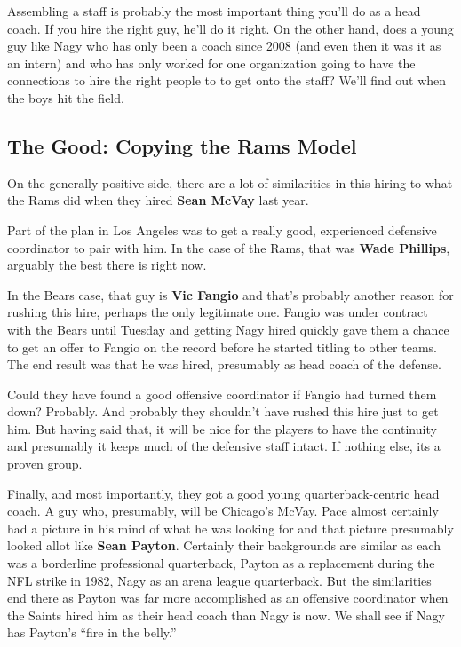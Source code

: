 \documentclass[11pt]{article}
\begin{document}
Assembling a staff is probably the most important thing you'll do as a
head coach.  If you hire the right guy, he'll do it right.  On the
other hand, does a young guy like Nagy who has only been a coach since
2008 (and even then it was it as an intern) and who has only
worked for one organization going to have the connections to hire the
right people to to get onto the staff?  We'll find out when the boys
hit the field.

\subsection{The Good:  Copying the Rams Model}

On the generally positive side, there are a lot of similarities in this hiring
to what the Rams did when they hired \textbf{Sean McVay} last year.

Part of the plan in Los Angeles was to get a really good, experienced
defensive coordinator to pair with him.  In the case of the Rams, that was \textbf{Wade
  Phillips}, arguably the best there is right now.

In the Bears case, that guy is \textbf{Vic Fangio} and that's probably
another reason for rushing this hire, perhaps the only legitimate one.
Fangio was under contract with the Bears until Tuesday and getting
Nagy hired quickly gave them a chance to get an offer to Fangio on the
record before he started titling to other teams.  The end result was
that he was hired, presumably as head coach of the defense.

Could they have found a good offensive coordinator if Fangio had
turned them down?  Probably.  And probably they shouldn't have rushed
this hire just to get him.  But having said that, it will be nice for
the players to have the continuity and presumably it keeps much of the
defensive staff intact.  If nothing else, its a proven group.

Finally, and most importantly, they got a good young
quarterback-centric head coach.  A guy who, presumably, will be
Chicago's McVay.  Pace almost certainly had a picture in his mind of
what he was looking for and that picture presumably looked allot like
\textbf{Sean Payton}.  Certainly their backgrounds are similar as each
was a borderline professional quarterback, Payton as a replacement
during the NFL strike in 1982, Nagy as an arena league quarterback.
But the similarities end there as Payton was far more accomplished as
an offensive coordinator when the Saints hired him as their head coach
than Nagy is now.  We shall see if Nagy has Payton's ``fire in the
belly.''
\end{document}
